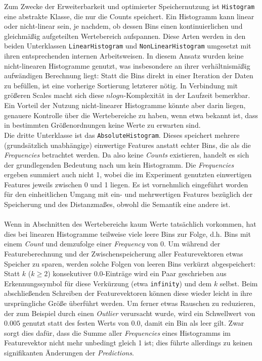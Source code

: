 Zum Zwecke der Erweiterbarkeit und optimierter Speichernutzung ist \texttt{Histogram} eine abstrakte Klasse, die nur die Counts speichert. Ein Histogramm kann linear oder nicht-linear sein, je nachdem, ob dessen Bins einen kontinuierlichen und gleichmäßig aufgeteilten Wertebereich aufspannen. Diese Arten werden in den beiden Unterklassen \texttt{LinearHistogram} und \texttt{NonLinearHistogram} umgesetzt mit ihren entsprechenden internen Arbeitsweisen. In diesem Ansatz wurden keine nicht-linearen Histogramme genutzt, was insbesondere an ihrer verhältnismäßig aufwändigen Berechnung liegt: Statt die Bins direkt in einer Iteration der Daten zu befüllen, ist eine vorherige Sortierung letzterer nötig. In Verbindung mit größeren Scales macht sich diese $nlogn$-Komplexität in der Laufzeit bemerkbar. Ein Vorteil der Nutzung nicht-linearer Histogramme könnte aber darin liegen, genauere Kontrolle über die Wertebereiche zu haben, wenn etwa bekannt ist, dass in bestimmten Größenordnungen keine Werte zu erwarten sind. \\ 
Die dritte Unterklasse ist das \texttt{AbsoluteHistogram}. Dieses speichert mehrere (grundsätzlich unabhängige) einwertige Features anstatt echter Bins, die als die \textit{Frequencies} betrachtet werden. Da also keine \textit{Counts} existieren, handelt es sich der grundlegenden Bedeutung nach um kein Histogramm. Die \textit{Frequencies} ergeben summiert auch nicht 1, wobei die im Experiment genutzten einwertigen Features jeweils zwischen 0 und 1 liegen. Es ist vornehmlich eingeführt worden für den einheitlichen Umgang mit ein- und mehrwertigen Features bezüglich der Speicherung und des Distanzmaßes, obwohl die Semantik eine andere ist. \\\\
Wenn in Abschnitten des Wertebereichs kaum Werte tatsächlich vorkommen, hat dies bei linearen Histogramme teilweise viele leere Bins zur Folge, d.h. Bins mit einem \textit{Count} und demzufolge einer \textit{Frequency} von 0. Um während der Featureberechnung und der Zwischenspeicherung aller Featurevektoren etwas Speicher zu sparen, werden solche Folgen von leeren Bins verkürzt abgespeichert: Statt $k$ ($k \geq 2$) konsekutiver $0.0$-Einträge wird ein Paar geschrieben aus Erkennungssymbol für diese Verkürzung (etwa \texttt{infinity}) und dem $k$ selbst. Beim abschließenden Schreiben der Featurevektoren können diese wieder leicht in ihre ursprüngliche Größe überführt werden. Um ferner etwas Rauschen zu reduzieren, der zum Beispiel durch einen \textit{Outlier} verursacht wurde, wird ein Schwellwert von $0.005$ genutzt statt des festen Werts von $0.0$, damit ein Bin als leer gilt. Zwar sorgt dies dafür, dass die Summe aller \textit{Frequencies} eines Histogramms im Featurevektor nicht mehr unbedingt gleich 1 ist; dies führte allerdings zu keinen signifikanten Änderungen der \textit{Predictions}. \\
